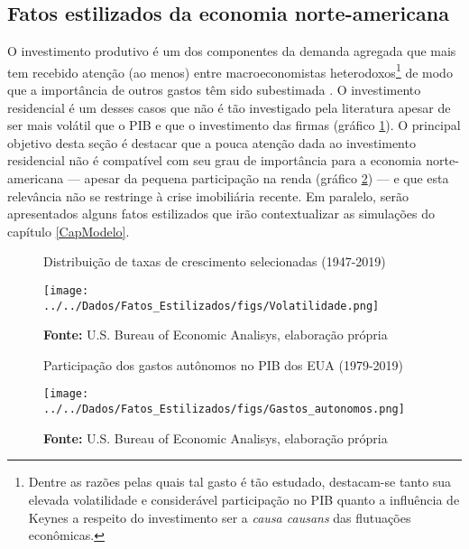 \subsection{Fatos estilizados da economia norte-americana}\label{FatosEUA}

O investimento produtivo é um dos componentes da demanda agregada que mais tem recebido atenção (ao menos) entre macroeconomistas heterodoxos\footnote{Dentre as razões pelas quais tal gasto é tão estudado, destacam-se tanto sua elevada volatilidade e considerável participação no PIB quanto a influência de Keynes a respeito do investimento ser a \textit{causa causans} das flutuações econômicas.} de modo que a importância de outros gastos têm sido subestimada \cite{brochier_macroeconomics_2017}.
O investimento residencial é um desses casos que não é tão investigado pela literatura apesar de ser mais volátil que o PIB e que o investimento das firmas (gráfico \ref{FigVolatilidade}).
O principal objetivo desta seção é destacar que a pouca atenção dada ao investimento residencial não é compatível com seu grau de importância  para a economia norte-americana ---  apesar da pequena participação na renda (gráfico \ref{FigAutonomos}) --- e que esta relevância não se restringe à crise imobiliária recente.
Em paralelo, serão apresentados alguns fatos estilizados que irão contextualizar as simulações do capítulo \ref{CapModelo}.




\begin{figure}[H]
	\centering
	\caption{Distribuição de taxas de crescimento selecionadas (1947-2019)}
	\label{FigVolatilidade}
	\texttt{[image: ../../Dados/Fatos\_Estilizados/figs/Volatilidade.png]}
	\caption*{\textbf{Fonte:} U.S. Bureau of Economic Analisys, elaboração própria}
\end{figure}


\begin{figure}[H]
	\centering
	\caption{Participação dos gastos autônomos no PIB dos EUA (1979-2019)}
	\label{FigAutonomos}
	\texttt{[image: ../../Dados/Fatos\_Estilizados/figs/Gastos\_autonomos.png]}
	\caption*{\textbf{Fonte:} U.S. Bureau of Economic Analisys, elaboração própria}
\end{figure}


